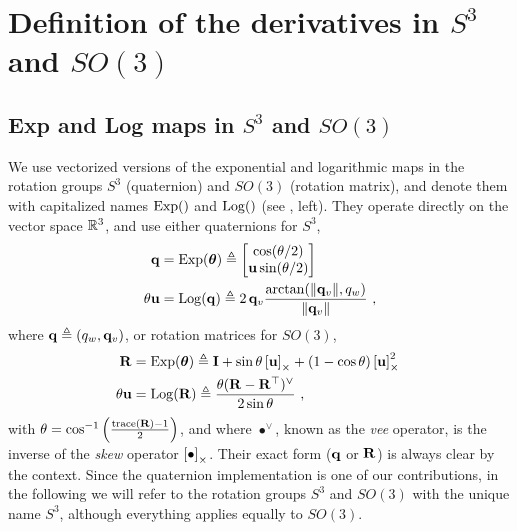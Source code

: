 
\appendices


\small

\section{Definition of the derivatives in $S^3$ and $SO(3)$}
\label{sec:derivatives_SO3}


\subsection{Exp and Log maps in $S^3$ and $SO(3)$}

We use vectorized versions of the exponential and logarithmic maps in the rotation groups $S^3$ (quaternion) and $SO(3)$ (rotation matrix), and denote them with capitalized names $\operatorname*{Exp}()$ and $\operatorname*{Log}()$ (see , left). They operate directly on the vector space ${\mathbb R}^3$, and use either quaternions for $S^3$,
%
\begin{subequations}
\begin{align}
{\bf q}
&= \operatorname*{Exp}({{\bm \theta}}) \triangleq \begin{bmatrix}
\cos(\theta/2) \\ {\bf u}\sin(\theta/2)
\end{bmatrix}\\ 
\theta{\bf u} &= \operatorname*{Log}({\bf q}) \triangleq 2\,{{\bf q}_v}\frac{\arctan({{\left\|{{\bf q}_v}\right\|},q_w})}{{\left\|{{\bf q}_v}\right\|}}
~,
\end{align}
\end{subequations}
%
where ${\bf q}\triangleq(q_w,{{\bf q}_v})$, or rotation matrices for $SO(3)$, 
%
\begin{subequations}
\begin{align}
{\bf R}
&= \operatorname*{Exp}({{\bm \theta}}) \triangleq {\bf I} + \sin\theta\left[{\bf u}\right]_\times + (1-\cos\theta)\left[{\bf u}\right]_\times^2~ \label{equ:rodrigues} \\ 
\theta{\bf u} &= \operatorname*{Log}({\bf R}) \triangleq \frac{\theta({\bf R}-{\bf R}^{\top})^\vee}{2\sin\theta} 
~,
\end{align}
\end{subequations}
%
with $\theta=\cos^{-1}\left(\frac{\operatorname*{trace}({\bf R})-1}{2}\right)$,
and where $\bullet^\vee$, known as the \emph{vee} operator, is the inverse of the \emph{skew} operator $\left[\bullet\right]_\times$. 
Their exact form (${\bf q}$ or ${\bf R}$) is always clear by the context.
Since the quaternion implementation is one of our contributions, in the following we will refer to the rotation groups $S^3$ and $SO(3)$ with the unique name $S^3$, although everything applies equally to $SO(3)$. 




